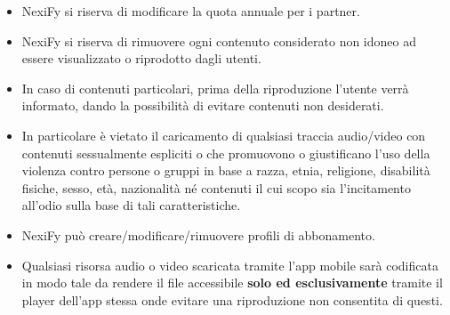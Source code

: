 \begin{itemize}
\item NexiFy si riserva di modificare la quota annuale per i partner.
\item NexiFy si riserva di rimuovere ogni contenuto considerato non idoneo ad essere visualizzato o riprodotto dagli utenti.
\item In caso di contenuti particolari, prima della riproduzione l'utente verrà informato, dando la possibilità di evitare contenuti non desiderati.
\item In particolare è vietato il caricamento di qualsiasi traccia audio/video con contenuti sessualmente espliciti o che promuovono o giustificano l'uso della violenza contro persone o gruppi in base a razza, etnia, religione, disabilità fisiche, sesso, età, nazionalità né contenuti il cui scopo sia l'incitamento all'odio sulla base di tali caratteristiche. 
\item NexiFy può creare/modificare/rimuovere profili di abbonamento. 
\item Qualsiasi risorsa audio o video scaricata tramite l'app mobile sarà codificata in modo tale da rendere il file accessibile \textbf{solo ed esclusivamente} tramite il player dell'app stessa onde evitare una riproduzione non consentita di questi.
\end{itemize}
 

